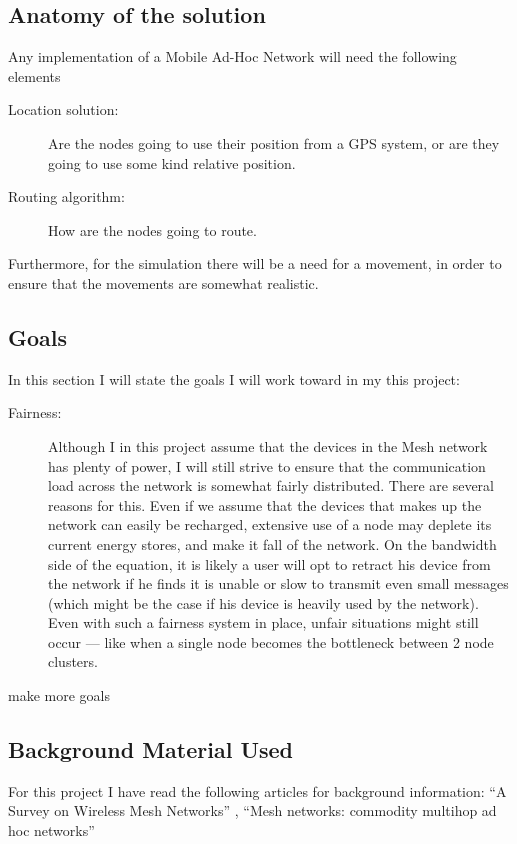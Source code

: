 

\subsection{Anatomy of the solution}

Any implementation of a Mobile Ad-Hoc Network will need the following elements

\begin{description}
\item[Location solution:] Are the nodes going to use their position from a GPS system, or are they going to use some kind relative position.
\item[Routing algorithm:] How are the nodes going to route. 
\end{description} 

Furthermore, for the simulation there will be a need for a movement, in order to ensure that the movements are somewhat realistic.

\subsection{Goals}
In this section I will state the goals I will work toward in my this project:

\begin{description}
\item[Fairness:] Although I in this project assume that the devices in the Mesh network has plenty of power, I will still strive to ensure that the communication load across the network is somewhat fairly distributed. There are several reasons for this. Even if we assume that the devices that makes up the network can easily be recharged, extensive use of a node may deplete its current energy stores, and make it fall of the network. On the bandwidth side of the equation, it is likely a user will opt to retract his device from the network if he finds it is unable or slow to transmit even small messages (which might be the case if his device is heavily used by the network). Even with such a fairness system in place, unfair situations might still occur --- like when a single node becomes the bottleneck between 2 node clusters. 
\item[make more goals] 
\end{description}

\subsection{Background Material Used}
For this project I have read the following articles for background information: ``A Survey on Wireless Mesh Networks'' \cite{martinWirelessSurvey}, ``Mesh networks: commodity multihop ad hoc networks''\cite{martinMeshnetwork} 

